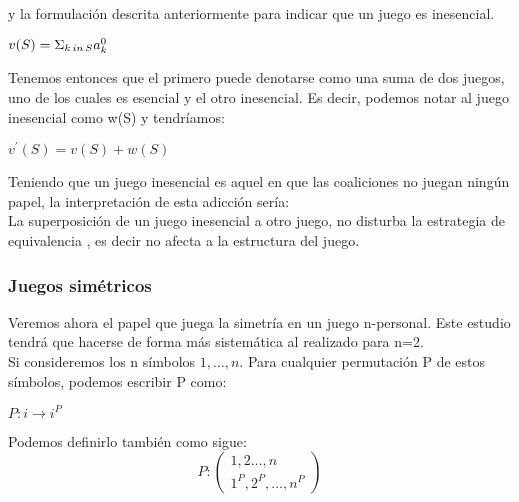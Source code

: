 \documentclass[10pt,a4paper]{book}
\begin{document}
y la formulación descrita anteriormente para indicar que un juego es inesencial.


\begin{center}

$v(S)= \Sigma_{k \thinspace  in \thinspace S}a^0_k$

\end{center}

Tenemos entonces que el primero puede denotarse como una suma de dos juegos, uno de los cuales es esencial y el otro inesencial. Es decir, podemos notar al juego inesencial como w(S) y tendríamos:\\


\begin{center}

$v^{'}(S)=v(S)+ w(S)$

\end{center}

Teniendo que un juego inesencial es aquel en que las coaliciones no juegan ningún papel, la interpretación de esta adicción sería:\\

La superposición de un juego inesencial a otro juego, no disturba la estrategia de equivalencia , es decir no afecta a la estructura del juego.\\


\subsubsection{Juegos simétricos}

Veremos ahora el papel que juega la simetría en un juego n-personal. Este estudio tendrá que hacerse de forma más sistemática al realizado para n=2. \\

Si consideremos los n símbolos $1, \ldots ,n$. Para cualquier permutación P de estos símbolos, podemos escribir P como:\\

\begin{center}

$P: i \rightarrow i^P$

\end{center}

Podemos definirlo también como sigue:\\

\begin{equation}
	P:\begin{pmatrix}
		1, 2 \ldots, n \\
		1^P, 2^P, \ldots ,n^P
	\end{pmatrix}
\end{equation}
\end{document}
